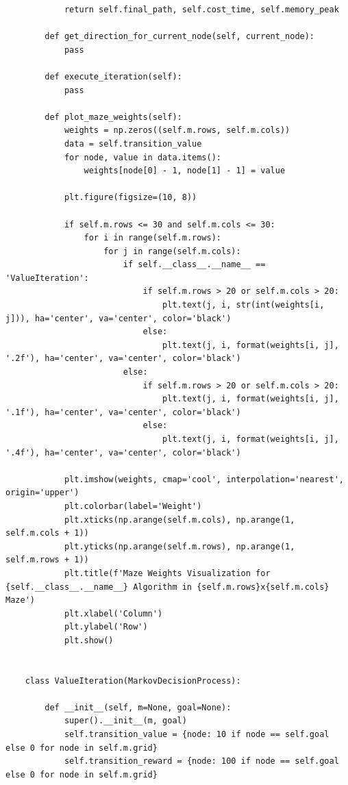 \documentclass{article}
\begin{document}
\begin{lstlisting}
            return self.final_path, self.cost_time, self.memory_peak
    
        def get_direction_for_current_node(self, current_node):
            pass
    
        def execute_iteration(self):
            pass
    
        def plot_maze_weights(self):
            weights = np.zeros((self.m.rows, self.m.cols))
            data = self.transition_value
            for node, value in data.items():
                weights[node[0] - 1, node[1] - 1] = value
    
            plt.figure(figsize=(10, 8))
    
            if self.m.rows <= 30 and self.m.cols <= 30:
                for i in range(self.m.rows):
                    for j in range(self.m.cols):
                        if self.__class__.__name__ == 'ValueIteration':
                            if self.m.rows > 20 or self.m.cols > 20:
                                plt.text(j, i, str(int(weights[i, j])), ha='center', va='center', color='black')
                            else:
                                plt.text(j, i, format(weights[i, j], '.2f'), ha='center', va='center', color='black')
                        else:
                            if self.m.rows > 20 or self.m.cols > 20:
                                plt.text(j, i, format(weights[i, j], '.1f'), ha='center', va='center', color='black')
                            else:
                                plt.text(j, i, format(weights[i, j], '.4f'), ha='center', va='center', color='black')
    
            plt.imshow(weights, cmap='cool', interpolation='nearest', origin='upper')
            plt.colorbar(label='Weight')
            plt.xticks(np.arange(self.m.cols), np.arange(1, self.m.cols + 1))
            plt.yticks(np.arange(self.m.rows), np.arange(1, self.m.rows + 1))
            plt.title(f'Maze Weights Visualization for {self.__class__.__name__} Algorithm in {self.m.rows}x{self.m.cols} Maze')
            plt.xlabel('Column')
            plt.ylabel('Row')
            plt.show()
    
    
    class ValueIteration(MarkovDecisionProcess):
    
        def __init__(self, m=None, goal=None):
            super().__init__(m, goal)
            self.transition_value = {node: 10 if node == self.goal else 0 for node in self.m.grid}
            self.transition_reward = {node: 100 if node == self.goal else 0 for node in self.m.grid}
    

\end{lstlisting}
\end{document}
